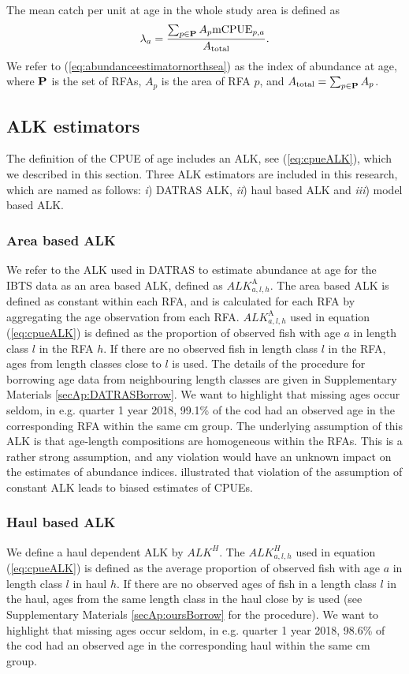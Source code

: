 \documentclass[a4paper 12pt]{article}
\numberwithin{equation}{section}
\begin{document}
 The mean catch per unit at age in the whole study area is defined as
\begin{equation}
\lambda_{a}= \frac{\sum_{p\in {\bf P}} A_{p}  \mathrm{mCPUE}_{p,a}}{A_{\text{total}}}.
\label{eq:abundanceestimatornorthsea}
\end{equation}
We refer to (\ref{eq:abundanceestimatornorthsea}) as the index of abundance at age, where ${\bf P}$ is the set of RFAs, $A_p$ is the area of RFA $p$, and $A_{\text{total}} = \sum_{p\in {\bf P}} A_{p}$.
\subsection{ALK estimators}
\label{sec:alkmethods}
The definition of the CPUE of age includes an ALK, see (\ref{eq:cpueALK}), which we described in this section. Three ALK estimators are included in this research, which are named as follows:  \textit{i}) DATRAS ALK, \textit{ii}) haul based ALK and \textit{iii}) model based ALK.
\subsubsection{Area based ALK}
\label{sec:datrasalkestimator}

We refer to the ALK used in DATRAS to estimate abundance at age for the IBTS data as an area based ALK, defined as $ALK^{\text{A}}_{a,l,h}$. The area based ALK is defined as constant within each RFA, and is calculated for each RFA by aggregating the age observation from each RFA. $ALK^{\text{A}}_{a,l,h}$ used in equation (\ref{eq:cpueALK}) is defined as the proportion of observed fish with age $a$ in length class $l$ in the RFA $h$. If there are no observed fish in length class $l$ in the RFA, ages from length classes close to $l$ is used. The details of the procedure for borrowing age data from neighbouring length classes are given in Supplementary Materials \ref{secAp:DATRASBorrow}. We want to highlight that missing ages occur seldom, in e.g. quarter 1 year 2018, 99.1\% of the cod had an observed age in the corresponding RFA within the same cm group.  The underlying assumption of this ALK  is that age-length compositions are homogeneous within the RFAs. This is a rather strong assumption, and any violation would have an unknown impact on the estimates of abundance indices. \citet{aanes2015efficient} illustrated that violation of the assumption of constant ALK leads to biased estimates of CPUEs. 


\subsubsection{Haul based ALK}
\label{sec:haulestimator}
We define a haul dependent ALK  by  $ALK^{H}$. The $ALK^{H}_{a,l,h}$  used in equation (\ref{eq:cpueALK}) is defined as the average proportion of observed fish with age $a$ in  length class $l$ in haul $h$. If there are no observed ages of fish in a length class $l$ in the haul, ages from the same length class in the haul close by is used (see Supplementary Materials \ref{secAp:oursBorrow} for the procedure). We want to highlight that missing ages occur seldom, in e.g. quarter 1 year 2018, 98.6\% of the cod had an observed age in the corresponding haul within the same cm group. 
\end{document}
